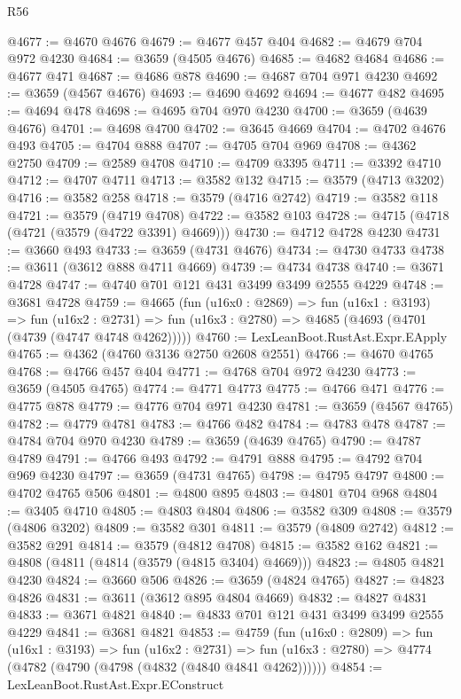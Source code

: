 \begin{lexlean}{R56}
\begin{coremodule}
@4677 := @4670 @4676
@4679 := @4677 @457 @404
@4682 := @4679 @704 @972 @4230
@4684 := @3659 (@4505 @4676)
@4685 := @4682 @4684
@4686 := @4677 @471
@4687 := @4686 @878
@4690 := @4687 @704 @971 @4230
@4692 := @3659 (@4567 @4676)
@4693 := @4690 @4692
@4694 := @4677 @482
@4695 := @4694 @478
@4698 := @4695 @704 @970 @4230
@4700 := @3659 (@4639 @4676)
@4701 := @4698 @4700
@4702 := @3645 @4669
@4704 := @4702 @4676 @493
@4705 := @4704 @888
@4707 := @4705 @704 @969
@4708 := @4362 @2750
@4709 := @2589 @4708
@4710 := @4709 @3395
@4711 := @3392 @4710
@4712 := @4707 @4711
@4713 := @3582 @132
@4715 := @3579 (@4713 @3202)
@4716 := @3582 @258
@4718 := @3579 (@4716 @2742)
@4719 := @3582 @118
@4721 := @3579 (@4719 @4708)
@4722 := @3582 @103
@4728 := @4715 (@4718 (@4721 (@3579 (@4722 @3391) @4669)))
@4730 := @4712 @4728 @4230
@4731 := @3660 @493
@4733 := @3659 (@4731 @4676)
@4734 := @4730 @4733
@4738 := @3611 (@3612 @888 @4711 @4669)
@4739 := @4734 @4738
@4740 := @3671 @4728
@4747 := @4740 @701 @121 @431 @3499 @3499 @2555 @4229
@4748 := @3681 @4728
@4759 := @4665
    (fun (u16x0 : @2869) =>
    fun (u16x1 : @3193) =>
    fun (u16x2 : @2731) => fun (u16x3 : @2780) => @4685 (@4693 (@4701 (@4739 (@4747 @4748 @4262)))))
@4760 := LexLeanBoot.RustAst.Expr.EApply
@4765 := @4362 (@4760 @3136 @2750 @2608 @2551)
@4766 := @4670 @4765
@4768 := @4766 @457 @404
@4771 := @4768 @704 @972 @4230
@4773 := @3659 (@4505 @4765)
@4774 := @4771 @4773
@4775 := @4766 @471
@4776 := @4775 @878
@4779 := @4776 @704 @971 @4230
@4781 := @3659 (@4567 @4765)
@4782 := @4779 @4781
@4783 := @4766 @482
@4784 := @4783 @478
@4787 := @4784 @704 @970 @4230
@4789 := @3659 (@4639 @4765)
@4790 := @4787 @4789
@4791 := @4766 @493
@4792 := @4791 @888
@4795 := @4792 @704 @969 @4230
@4797 := @3659 (@4731 @4765)
@4798 := @4795 @4797
@4800 := @4702 @4765 @506
@4801 := @4800 @895
@4803 := @4801 @704 @968
@4804 := @3405 @4710
@4805 := @4803 @4804
@4806 := @3582 @309
@4808 := @3579 (@4806 @3202)
@4809 := @3582 @301
@4811 := @3579 (@4809 @2742)
@4812 := @3582 @291
@4814 := @3579 (@4812 @4708)
@4815 := @3582 @162
@4821 := @4808 (@4811 (@4814 (@3579 (@4815 @3404) @4669)))
@4823 := @4805 @4821 @4230
@4824 := @3660 @506
@4826 := @3659 (@4824 @4765)
@4827 := @4823 @4826
@4831 := @3611 (@3612 @895 @4804 @4669)
@4832 := @4827 @4831
@4833 := @3671 @4821
@4840 := @4833 @701 @121 @431 @3499 @3499 @2555 @4229
@4841 := @3681 @4821
@4853 := @4759
    (fun (u16x0 : @2809) =>
    fun (u16x1 : @3193) =>
    fun (u16x2 : @2731) =>
    fun (u16x3 : @2780) => @4774 (@4782 (@4790 (@4798 (@4832 (@4840 @4841 @4262))))))
@4854 := LexLeanBoot.RustAst.Expr.EConstruct

\end{coremodule}
\end{lexlean}
